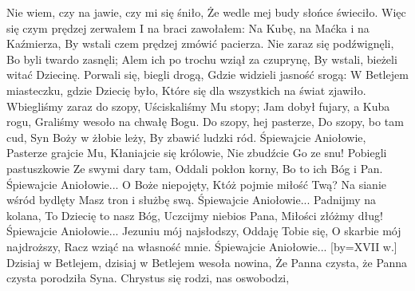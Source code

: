 \endverse
  \beginchorus
      Nie wiem, czy na jawie, czy mi się śniło,
      Że wedle mej budy słońce świeciło. 
  \endchorus
\beginverse
    Więc się czym prędzej zerwałem
    I na braci zawołałem:
\endverse
  \beginchorus
      Na Kubę, na Maćka i na Kaźmierza,
      By wstali czem prędzej zmówić pacierza.
  \endchorus
\beginverse
    Nie zaraz się podźwignęli,
    Bo byli twardo zasnęli;
\endverse
  \beginchorus
      Alem ich po trochu wziął za czuprynę,
      By wstali, bieżeli witać Dziecinę.
  \endchorus
\beginverse
    Porwali się, biegli drogą,
    Gdzie widzieli jasność srogą:
\endverse
  \beginchorus
      W Betlejem miasteczku, gdzie Dziecię było,
      Które się dla wszystkich na świat zjawiło.
  \endchorus
\beginverse
    Wbiegliśmy zaraz do szopy,
    Uściskaliśmy Mu stopy;
\endverse
  \beginchorus
      Jam dobył fujary, a Kuba rogu,
      Graliśmy wesoło na chwałę Bogu.
  \endchorus
\endsong
\beginverse
    Do szopy, hej pasterze,
    Do szopy, bo tam cud,
    Syn Boży w żłobie leży,
    By zbawić ludzki ród.
\endverse
\beginchorus
        Śpiewajcie Aniołowie,
        Pasterze grajcie Mu,
        Kłaniajcie się królowie,
        Nie zbudźcie Go ze snu!
\endchorus
\beginverse
    Pobiegli pastuszkowie
    Ze swymi dary tam,
    Oddali pokłon korny,
    Bo to ich Bóg i Pan.
\endverse
\beginchorus
        Śpiewajcie Aniołowie...
\endchorus
\beginverse
    O Boże niepojęty,
    Któż pojmie miłość Twą?
    Na sianie wśród bydlęty
    Masz tron i służbę swą.
\endverse
\beginchorus
        Śpiewajcie Aniołowie...
\endchorus
\beginverse
    Padnijmy na kolana,
    To Dziecię to nasz Bóg,
    Uczcijmy niebios Pana,
    Miłości złóżmy dług!
\endverse
\beginchorus
        Śpiewajcie Aniołowie...
\endchorus
\beginverse
    Jezuniu mój najsłodszy,
    Oddaję Tobie się,
    O skarbie mój najdroższy,
    Racz wziąć na własność mnie.
\endverse
\beginchorus
        Śpiewajcie Aniołowie...
\endchorus
\endsong
[by={XVII w.}]
\beginverse
    Dzisiaj w Betlejem, dzisiaj w Betlejem wesoła nowina,
    Że Panna czysta, że Panna czysta porodziła Syna.
\endverse
\beginchorus
    Chrystus się rodzi, nas oswobodzi,
